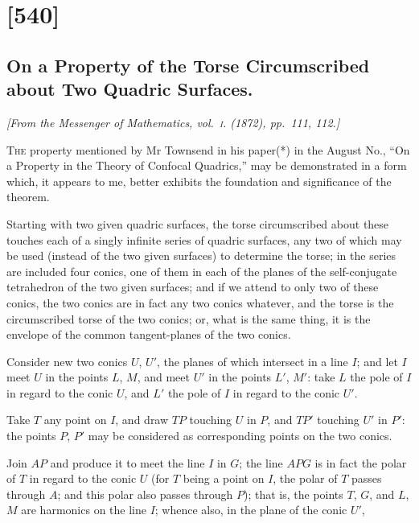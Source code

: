 \documentclass[11pt,a4paper]{book}
\begin{document}
\clearpage

\section{[540]}
\subsection{On a Property of the Torse Circumscribed about Two Quadric Surfaces.}

\begin{center}
\textit{[From the Messenger of Mathematics, vol.~\textsc{i}. (1872), pp.~111, 112.]}
\end{center}

\textsc{The} property mentioned by Mr Townsend in his paper(*) in the August No., ``On a Property in the Theory of Confocal Quadrics,'' may be demonstrated in a form which, it appears to me, better exhibits the foundation and significance of the theorem.

Starting with two given quadric surfaces, the torse circumscribed about these touches each of a singly infinite series of quadric surfaces, any two of which may be used (instead of the two given surfaces) to determine the torse; in the series are included four conics, one of them in each of the planes of the self-conjugate tetrahedron of the two given surfaces; and if we attend to only two of these conics, the two conics are in fact any two conics whatever, and the torse is the circumscribed torse of the two conics; or, what is the same thing, it is the envelope of the common tangent-planes of the two conics.

Consider new two conics $U$, $U'$, the planes of which intersect in a line $I$; and let $I$ meet $U$ in the points $L$, $M$, and meet $U'$ in the points $L'$, $M'$: take $L$ the pole of $I$ in regard to the conic $U$, and $L'$ the pole of $I$ in regard to the conic $U'$.

Take $T$ any point on $I$, and draw $TP$ touching $U$ in $P$, and $TP'$ touching $U'$ in $P'$: the points $P$, $P'$ may be considered as corresponding points on the two conics.

Join $AP$ and produce it to meet the line $I$ in $G$; the line $APG$ is in fact the polar of $T$ in regard to the conic $U$ (for $T$ being a point on $I$, the polar of $T$ passes through $A$; and this polar also passes through $P$); that is, the points $T$, $G$, and $L$, $M$ are harmonics on the line $I$; whence also, in the plane of the conic $U'$,
\end{document}
